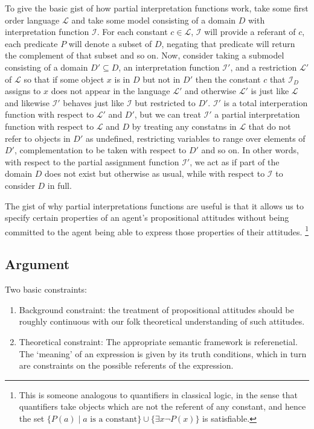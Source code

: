 \documentclass[10pt]{article}
\begin{document}
To give the basic gist of how partial interpretation functions work, take some first order language \(\mathcal{L}\) and take some model consisting of a domain \(D\) with interpretation function \(\mathcal{I}\).
For each constant \(c \in \mathcal{L}\), \(\mathcal{I}\) will provide a referant of \(c\), each predicate \(P\) will denote a subset of \(D\), negating that predicate will return the complement of that subset and so on.
Now, consider taking a submodel consisting of a domain \(D' \subseteq D\), an interpretation function \(\mathcal{I}'\), and a restriction \(\mathcal{L}'\) of \(\mathcal{L}\) so that if some object \(x\) is in \(D\) but not in \(D'\) then the constant \(c\) that \(\mathcal{I}_{D}\) assigns to \(x\) does not appear in the language \(\mathcal{L}'\) and otherwise \(\mathcal{L}'\) is just like \(\mathcal{L}\) and likewise \(\mathcal{I}'\) behaves just like \(\mathcal{I}\) but restricted to \(D'\).
\(\mathcal{I}'\) is a total interperation function with respect to \(\mathcal{L}'\) and \(D'\), but we can treat \(\mathcal{I}'\) a partial interpretation function with respect to \(\mathcal{L}\) and \(D\) by treating any constatns in \(\mathcal{L}\) that do not refer to objects in \(D'\) as undefined, restricting variables to range over elements of \(D'\), complementation to be taken with respect to \(D'\) and so on.
In other words, with respect to the partial assignment function \(\mathcal{I}'\), we act as if part of the domain \(D\) does not exist but otherwise as usual, while with respect to \(\mathcal{I}\) to consider \(D\) in full.

The gist of why partial interpretations functions are useful is that it allows us to specify certain properties of an agent's propositional attitudes without being committed to the agent being able to express those properties of their attitudes.\nolinebreak
\footnote{This is someone analogous to quantifiers in classical logic, in the sense that quantifiers take objects which are not the referent of any constant, and hence the set \(\{P(a) \mid a \text{ is a constant}\} \cup \{\exists x \lnot P(x)\}\) is satisfiable.}

\subsection{Argument}
\label{sec:argument}

Two basic constraints:
\begin{enumerate}
\item Background constraint: the treatment of propositional attitudes should be roughly continuous with our folk theoretical understanding of such attitudes.
\item Theoretical constraint: The appropriate semantic framework is referenetial.
  The `meaning' of an expression is given by its truth conditions, which in turn are constraints on the possible referents of the expression.
\end{enumerate}
\end{document}

